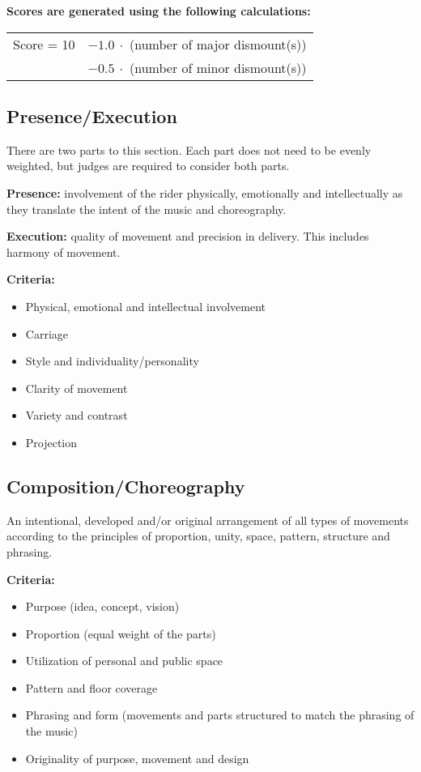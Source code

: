 \textbf{Scores are generated using the following calculations:}

\begin{tabular}{r l}
Score = 10 & $- 1.0\ \cdot$ (number of major dismount(s)) \\
 & $- 0.5\ \cdot$ (number of minor dismount(s)) \\
\end{tabular}


\subsection{Presence/Execution \label{subsec:freestyle_individual-performance-score_presence-execution}}
There are two parts to this section.
Each part does not need to be evenly weighted, but judges are required to consider both parts.

\textbf{Presence:} involvement of the rider physically, emotionally and intellectually as they translate the intent of the music and choreography.

\textbf{Execution:} quality of movement and precision in delivery.
This includes harmony of movement.

\textbf{Criteria:}
\begin{itemize}
\item Physical, emotional and intellectual involvement
\item Carriage
\item Style and individuality/personality
\item Clarity of movement
\item Variety and contrast
\item Projection
\end{itemize}

\subsection{Composition/Choreography}
An intentional, developed and/or original arrangement of all types of movements according to the principles of proportion, unity, space, pattern, structure and phrasing.

\textbf{Criteria:}
\begin{itemize}
\item Purpose (idea, concept, vision)
\item Proportion (equal weight of the parts)
\item Utilization of personal and public space
\item Pattern and floor coverage
\item Phrasing and form (movements and parts structured to match the phrasing of the music)
\item Originality of purpose, movement and design
\end{itemize}


